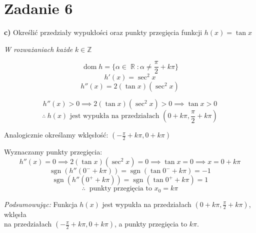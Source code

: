 \documentclass[12pt]{article}
\newcommand{\task}[1]{\section*{Zadanie #1}}
\newcommand{\ex}[1]{\textbf{ #1)}}
\DeclareMathOperator{\dom}{dom}
\DeclareMathOperator{\sgn}{sgn}
\DeclareMathOperator{\R}{\mathbb{R}}
\begin{document}
\task{6}\ex{c}
Określić przedziały wypukłości oraz punkty przegięcia funkcji $ h(x) = \tan{x} $

\textit{W rozważaniach każde} $k \in \mathbb{Z}$

$$ \dom{h} = \{ \alpha \in \R : \alpha \ne \frac{\pi}{2} + k\pi \} $$
$$ h'(x) = \sec^2{x} $$
$$ h''(x) = 2(\tan{x})(\sec^2{x}) $$

$$ h''(x) > 0 \implies 2(\tan{x})(\sec^2{x}) > 0 \implies \tan{x} > 0 $$
$$ \therefore \ h(x) \textrm{ jest wypukła na przedziałach } (0 + k\pi, \frac{\pi}{2} + k\pi) $$

Analogicznie określamy wklęsłość: $ (-\frac{\pi}{2} + k\pi, 0 + k\pi) $

Wyznaczamy punkty przegięcia:
$$ h''(x) = 0 \implies 2(\tan{x})(\sec^2{x}) = 0 \implies \tan{x} = 0 \implies x = 0 + k\pi $$
$$ \sgn(h''(0^- + k\pi)) = \sgn(\tan{0^- + k\pi}) = -1 $$
$$ \sgn(h''(0^+ + k\pi)) = \sgn(\tan{0^+ + k\pi}) =  1 $$
$$ \therefore \ \textrm{ punkty przegięcia to } x_0 = k\pi $$

\textit{Podsumowując:} Funkcja $h(x)$ jest wypukła na przedziałach $ (0 + k\pi, \frac{\pi}{2} + k\pi) $,
    wklęsła\\ na przedziałach $ (-\frac{\pi}{2} + k\pi, 0 + k\pi) $, a punkty
    przegięcia to $k\pi$.
\end{document}
